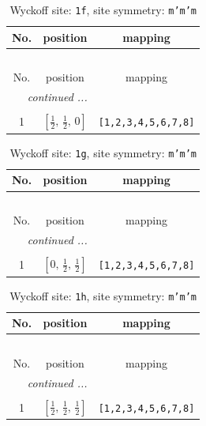 \documentclass[fleqn,8pt]{jsarticle}
\begin{document}
\renewcommand{\arraystretch}{1.2}
\begin{longtable}{ccc}
\caption{Wyckoff site: {\tt 1f}, site symmetry: {\tt m'm'm}}
 \\
 \hline \hline
No. & position & mapping \\ \hline \endfirsthead

\multicolumn{2}{l}{\tablename\ \thetable{}} \\
 \hline \hline
No. & position & mapping \\ \hline \endhead

 \hline \hline
\multicolumn{2}{r}{\footnotesize\it continued ...} \\ \endfoot

 \hline \hline
\multicolumn{2}{r}{} \\ \endlastfoot

1 & $\left[ \frac{1}{2},\, \frac{1}{2},\, 0 \right]$ & {\tt [1,2,3,4,5,6,7,8]} \\
\end{longtable}
\renewcommand{\arraystretch}{1.2}
\begin{longtable}{ccc}
\caption{Wyckoff site: {\tt 1g}, site symmetry: {\tt m'm'm}}
 \\
 \hline \hline
No. & position & mapping \\ \hline \endfirsthead

\multicolumn{2}{l}{\tablename\ \thetable{}} \\
 \hline \hline
No. & position & mapping \\ \hline \endhead

 \hline \hline
\multicolumn{2}{r}{\footnotesize\it continued ...} \\ \endfoot

 \hline \hline
\multicolumn{2}{r}{} \\ \endlastfoot

1 & $\left[ 0,\, \frac{1}{2},\, \frac{1}{2} \right]$ & {\tt [1,2,3,4,5,6,7,8]} \\
\end{longtable}
\renewcommand{\arraystretch}{1.2}
\begin{longtable}{ccc}
\caption{Wyckoff site: {\tt 1h}, site symmetry: {\tt m'm'm}}
 \\
 \hline \hline
No. & position & mapping \\ \hline \endfirsthead

\multicolumn{2}{l}{\tablename\ \thetable{}} \\
 \hline \hline
No. & position & mapping \\ \hline \endhead

 \hline \hline
\multicolumn{2}{r}{\footnotesize\it continued ...} \\ \endfoot

 \hline \hline
\multicolumn{2}{r}{} \\ \endlastfoot

1 & $\left[ \frac{1}{2},\, \frac{1}{2},\, \frac{1}{2} \right]$ & {\tt [1,2,3,4,5,6,7,8]} \\
\end{longtable}
\end{document}
